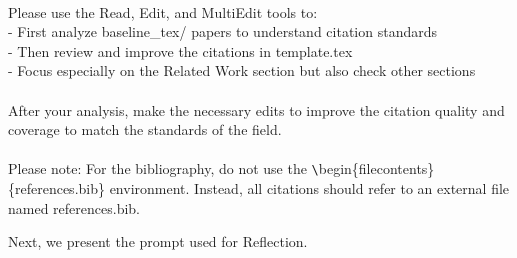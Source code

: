 \begin{tcolorbox}[colback=gray!10, colframe=gray!40!black, breakable=true, title=Prompt for Citation Validation]
\\
Please use the Read, Edit, and MultiEdit tools to:\\
- First analyze baseline\_tex/ papers to understand citation standards\\
- Then review and improve the citations in template.tex\\
- Focus especially on the Related Work section but also check other sections\\
\\
After your analysis, make the necessary edits to improve the citation quality and coverage to match the standards of the field.\\
\\
Please note: For the bibliography, do not use the \verb|\|begin\{filecontents\}\{references.bib\} environment. Instead, all citations should refer to an external file named references.bib.
\end{tcolorbox}

Next, we present the prompt used for Reflection.

